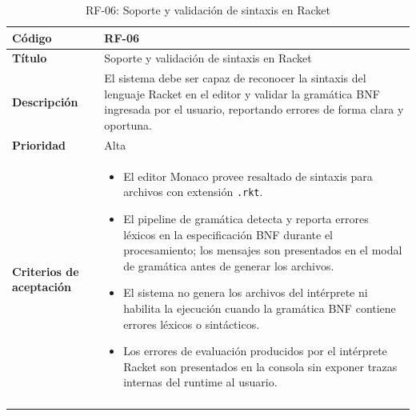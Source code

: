 \begin{longtable}{|>{\bfseries}p{3cm}|p{11cm}|}
\hline
\textbf{Código} & RF-06 \\
\hline
\textbf{Título} & Soporte y validación de sintaxis en Racket \\
\hline
\textbf{Descripción} & El sistema debe ser capaz de reconocer la sintaxis del lenguaje Racket en el editor y validar la gramática BNF ingresada por el usuario, reportando errores de forma clara y oportuna. \\
\hline
\textbf{Prioridad} & Alta \\
\hline
\textbf{Criterios de aceptación} &
\begin{itemize}[leftmargin=*,topsep=2pt,itemsep=1pt,parsep=0pt]
    \item El editor Monaco provee resaltado de sintaxis para archivos con extensión \texttt{.rkt}.
    \item El pipeline de gramática detecta y reporta errores léxicos en la especificación BNF durante el procesamiento; los mensajes son presentados en el modal de gramática antes de generar los archivos.
    \item El sistema no genera los archivos del intérprete ni habilita la ejecución cuando la gramática BNF contiene errores léxicos o sintácticos.
    \item Los errores de evaluación producidos por el intérprete Racket son presentados en la consola sin exponer trazas internas del runtime al usuario.
\end{itemize} \\
\hline
\caption{RF-06: Soporte y validación de sintaxis en Racket}
\label{tab:rf06}
\end{longtable}


